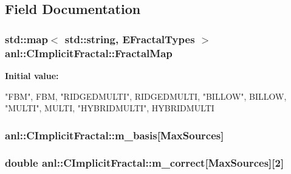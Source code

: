 \subsection{Field Documentation}
\hypertarget{classanl_1_1CImplicitFractal_ac95addb557671d188f3902351d123493}{
\subsubsection[{FractalMap}]{\setlength{\rightskip}{0pt plus 5cm}std::map$<$ std::string, {\bf EFractalTypes} $>$ {\bf anl::CImplicitFractal::FractalMap}}}
\label{classanl_1_1CImplicitFractal_ac95addb557671d188f3902351d123493}
{\bfseries Initial value:}
\begin{DoxyCode}
 {
        {"FBM", FBM},
        {"RIDGEDMULTI", RIDGEDMULTI},
        {"BILLOW", BILLOW},
        {"MULTI", MULTI},
        {"HYBRIDMULTI", HYBRIDMULTI}
    }
\end{DoxyCode}
\hypertarget{classanl_1_1CImplicitFractal_a067edf57220e5c6175c928b6f99dcdeb}{
\subsubsection[{m\_\-basis}]{ {\bf anl::CImplicitFractal::m\_\-basis}\mbox{[}MaxSources\mbox{]}}}
\label{classanl_1_1CImplicitFractal_a067edf57220e5c6175c928b6f99dcdeb}
\hypertarget{classanl_1_1CImplicitFractal_ad488afef8f7ee67b7582450463f88a5f}{
\subsubsection[{m\_\-correct}]{\setlength{\rightskip}{0pt plus 5cm}double {\bf anl::CImplicitFractal::m\_\-correct}\mbox{[}MaxSources\mbox{]}\mbox{[}2\mbox{]}}}
\label{classanl_1_1CImplicitFractal_ad488afef8f7ee67b7582450463f88a5f}
